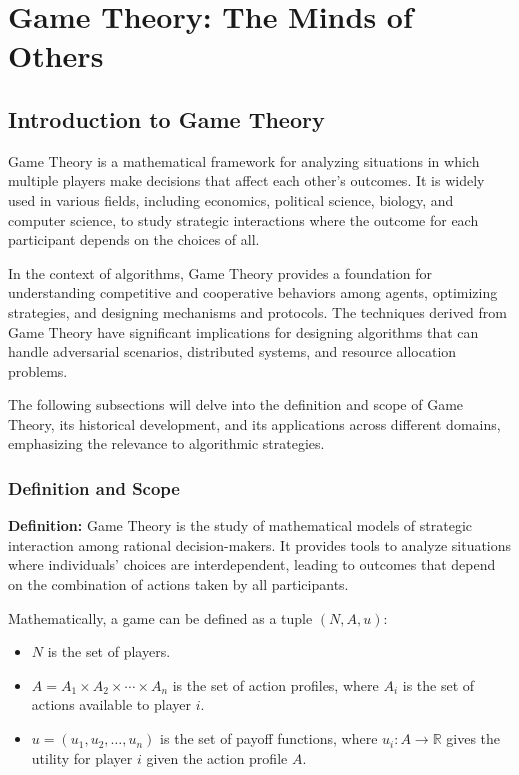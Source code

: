 \documentclass[12pt]{book} %
\begin{document}
\chapter{Game Theory: The Minds of Others}

\section{Introduction to Game Theory}

Game Theory is a mathematical framework for analyzing situations in which multiple players make decisions that affect each other's outcomes. It is widely used in various fields, including economics, political science, biology, and computer science, to study strategic interactions where the outcome for each participant depends on the choices of all.

In the context of algorithms, Game Theory provides a foundation for understanding competitive and cooperative behaviors among agents, optimizing strategies, and designing mechanisms and protocols. The techniques derived from Game Theory have significant implications for designing algorithms that can handle adversarial scenarios, distributed systems, and resource allocation problems.

The following subsections will delve into the definition and scope of Game Theory, its historical development, and its applications across different domains, emphasizing the relevance to algorithmic strategies.

\subsection{Definition and Scope}

\textbf{Definition:} Game Theory is the study of mathematical models of strategic interaction among rational decision-makers. It provides tools to analyze situations where individuals' choices are interdependent, leading to outcomes that depend on the combination of actions taken by all participants.

Mathematically, a game can be defined as a tuple \( (N, A, u) \):

\begin{itemize}
    \item \( N \) is the set of players.
    \item \( A = A_1 \times A_2 \times \cdots \times A_n \) is the set of action profiles, where \( A_i \) is the set of actions available to player \( i \).
    \item \( u = (u_1, u_2, \ldots, u_n) \) is the set of payoff functions, where \( u_i: A \rightarrow \mathbb{R} \) gives the utility for player \( i \) given the action profile \( A \).
\end{itemize}
\end{document}
